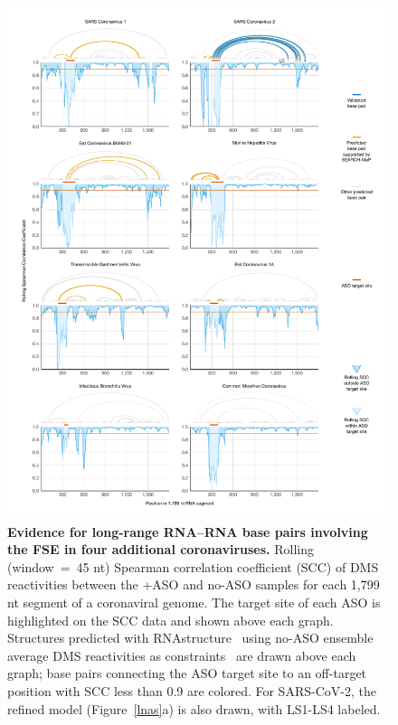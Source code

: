 \documentclass[main.tex]{subfiles}
\begin{document}
\begin{figure}[H]
	\includegraphics[width=\textwidth]{../MainFigures/covs/covs.pdf}
	\caption{\textbf{Evidence for long-range RNA--RNA base pairs involving the FSE in four additional coronaviruses.} Rolling (window~=~45 nt) Spearman correlation coefficient (SCC) of DMS reactivities between the +ASO and no-ASO samples for each 1,799 nt segment of a coronaviral genome. The target site of each ASO is highlighted on the SCC data and shown above each graph. Structures predicted with RNAstructure~\cite{Reuter2010} using no-ASO ensemble average DMS reactivities as constraints~\cite{Cordero2012} are drawn above each graph; base pairs connecting the ASO target site to an off-target position with SCC less than 0.9 are colored. For SARS-CoV-2, the refined model (Figure~\ref{lnas}a) is also drawn, with LS1-LS4 labeled.}
	\label{covs}
\end{figure}
\end{document}
